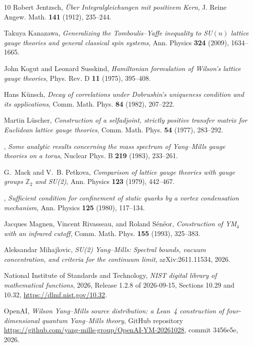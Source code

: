\documentclass[11pt,a4paper]{amsart}
\theoremstyle{definition}
\theoremstyle{remark}
\numberwithin{equation}{section}
\begin{document}
\begin{thebibliography}{10}
Robert Jentzsch, \emph{{\"U}ber {I}ntegralgleichungen mit positivem {K}ern}, J.
  Reine Angew. Math. \textbf{141} (1912), 235--244.

Takuya Kanazawa, \emph{Generalizing the {T}omboulis--{Y}affe inequality to
  {SU}$(n)$ lattice gauge theories and general classical spin systems}, Ann.
  Physics \textbf{324} (2009), 1634--1665.

John Kogut and Leonard Susskind, \emph{{H}amiltonian formulation of {W}ilson's
  lattice gauge theories}, Phys. Rev. D \textbf{11} (1975), 395--408.

Hans K{\"u}nsch, \emph{Decay of correlations under {D}obrushin's uniqueness
  condition and its applications}, Comm. Math. Phys. \textbf{84} (1982),
  207--222.

Martin L{\"u}scher, \emph{Construction of a selfadjoint, strictly positive
  transfer matrix for {E}uclidean lattice gauge theories}, Comm. Math. Phys.
  \textbf{54} (1977), 283--292.

\bysame, \emph{Some analytic results concerning the mass spectrum of
  {Y}ang--{M}ills gauge theories on a torus}, Nuclear Phys. B \textbf{219}
  (1983), 233--261.

G.~Mack and V.~B. Petkova, \emph{Comparison of lattice gauge theories with
  gauge groups {$\mathbb Z_2$} and {SU}(2)}, Ann. Physics \textbf{123} (1979),
  442--467.

\bysame, \emph{Sufficient condition for confinement of static quarks by a
  vortex condensation mechanism}, Ann. Physics \textbf{125} (1980), 117--134.

Jacques Magnen, Vincent Rivasseau, and Roland S{\'e}n{\'e}or,
  \emph{Construction of {YM}$_4$ with an infrared cutoff}, Comm. Math. Phys.
  \textbf{155} (1993), 325--383.

Aleksandar Mihajlovic, \emph{{SU(2)} {Y}ang--{M}ills: Spectral bounds, vacuum
  concentration, and criteria for the continuum limit}, arXiv:2611.11534, 2026.

{National Institute of Standards and Technology}, \emph{{NIST} digital library
  of mathematical functions}, 2026, Release 1.2.8 of 2026-09-15, Sections 10.29
  and 10.32, \url{https://dlmf.nist.gov/10.32}.

{OpenAI}, \emph{Wilson {Y}ang--{M}ills source distribution: a {L}ean~4
  construction of four-dimensional quantum {Y}ang--{M}ills theory}, GitHub
  repository \url{https://github.com/yang-mills-group/OpenAI-YM-20261028},
  commit 3456e5e, 2026.


\end{thebibliography}
\end{document}

